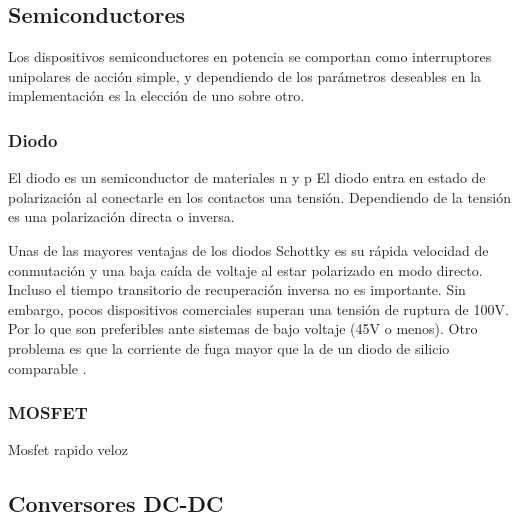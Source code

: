 \subsection{Semiconductores}
Los dispositivos semiconductores en potencia se comportan como interruptores unipolares de acción simple, y dependiendo de los parámetros deseables en la implementación es la elección de uno sobre otro. 
\subsubsection{Diodo}
El diodo es un semiconductor de materiales n y p 
El diodo entra en estado de polarización al conectarle en los contactos una tensión. Dependiendo de la tensión es una polarización directa o inversa.\par \par Unas de las mayores ventajas de los diodos Schottky es su rápida velocidad de conmutación y una baja caída de voltaje al estar polarizado en modo directo. Incluso el tiempo transitorio de recuperación inversa no es importante. Sin embargo, pocos dispositivos comerciales superan una tensión de ruptura de 100V. Por lo que son preferibles ante sistemas de bajo voltaje (45V o menos). Otro problema es que la corriente de fuga mayor que la de un diodo de silicio comparable \cite{power}.\par 
\subsubsection{MOSFET}
Mosfet rapido veloz
\subsection{Conversores DC-DC}

    
